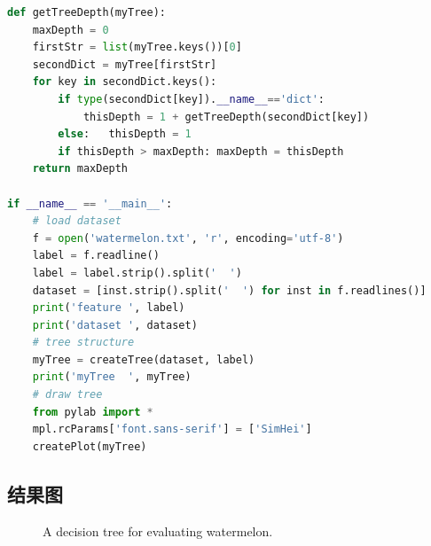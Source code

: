 \documentclass[UTF-8, a4paper, 10pt]{article}
\numberwithin{equation}{section}
\begin{document}
\begin{lstlisting}[language=python]
def getTreeDepth(myTree):
    maxDepth = 0
    firstStr = list(myTree.keys())[0]
    secondDict = myTree[firstStr]
    for key in secondDict.keys():
        if type(secondDict[key]).__name__=='dict':
            thisDepth = 1 + getTreeDepth(secondDict[key])
        else:   thisDepth = 1
        if thisDepth > maxDepth: maxDepth = thisDepth
    return maxDepth

if __name__ == '__main__':
    # load dataset
    f = open('watermelon.txt', 'r', encoding='utf-8')
    label = f.readline()
    label = label.strip().split('  ')
    dataset = [inst.strip().split('  ') for inst in f.readlines()]
    print('feature ', label)
    print('dataset ', dataset)
    # tree structure
    myTree = createTree(dataset, label)
    print('myTree  ', myTree)
    # draw tree
    from pylab import *
    mpl.rcParams['font.sans-serif'] = ['SimHei']
    createPlot(myTree)
\end{lstlisting}
\subsection{结果图}
\begin{figure}[!h]
\caption{A decision tree for evaluating watermelon.}
\label{fig:tree1}
\end{figure}
\end{document}
